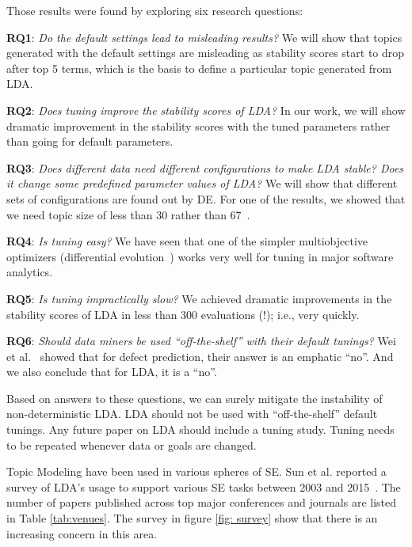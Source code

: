 \documentclass[conference]{IEEEtran}
\theoremstyle{break}
\begin{document}
Those results were found by exploring six research questions:
\begin{compactitem}
    \item \textbf{RQ1}: \textit{Do the default settings lead to misleading results?} We will show that topics generated with the default settings are misleading as stability scores start to drop after top 5 terms, which is the basis to define a particular topic generated from LDA.
    \item \textbf{RQ2}: \textit{Does tuning improve the stability scores of LDA?} In our work, we will show dramatic improvement in the stability scores with the tuned parameters rather than going for default parameters.
    \item \textbf{RQ3}: \textit{Does different data need different configurations to make LDA stable? Does it change some predefined parameter values of LDA?} We will show that different sets of configurations are found out by DE. For one of the results, we showed that we need topic size of less than 30 rather than 67~\cite{garousi2016citations}.
    \item \textbf{RQ4}: \textit{Is tuning easy?} We have seen that one of the simpler multiobjective optimizers (differential evolution~\cite{storn1997differential}) works very well for tuning in major software analytics.
    \item \textbf{RQ5}: \textit{Is tuning impractically slow?} We achieved dramatic improvements in the stability scores of LDA in less than 300 evaluations (!); i.e., very quickly.
    \item \textbf{RQ6}: \textit{Should data miners be used “off-the-shelf” with their default tunings?} Wei et al.~\cite{fu2016tuning} showed that for defect prediction, their answer is an emphatic “no”. And we also conclude that for LDA, it is a “no”. 
\end{compactitem}

Based on answers to these questions, we can surely mitigate the instability of non-deterministic LDA. LDA should not be used with “off-the-shelf” default tunings. Any future paper on LDA should include a tuning study. Tuning needs to be repeated whenever data or goals are changed.

Topic Modeling have been used in various spheres of SE. Sun et al. reported a survey of LDA's usage to support various SE tasks between 2003 and 2015~\cite{sun2016exploring}. The number of papers published across top major conferences and journals are listed in Table \ref{tab:venues}. The survey in figure \ref{fig: survey} show that there is an increasing concern in this area.
\end{document}

